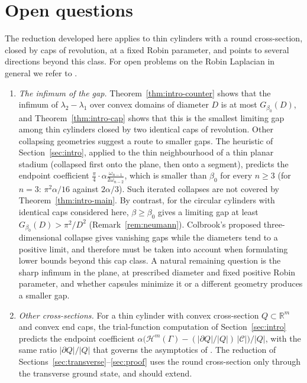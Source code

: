 \documentclass[11pt,a4paper]{article}
\numberwithin{equation}{section}
\theoremstyle{paperplain}
\theoremstyle{remark}
\newcommand{\R}{\mathbb{R}}
\newcommand{\C}{\mathcal{C}}
\newcommand{\HH}{\mathcal{H}}
\begin{document}
\FloatBarrier
\section{Open questions}\label{sec:open}
The reduction developed here applies to thin cylinders with a round
cross-section, closed by caps of revolution, at a fixed Robin parameter, and
points to several directions beyond this class. For open problems on the
Robin Laplacian in general we refer to \cite{BFK}.

\begin{enumerate}[label=(\arabic*)]
\item \emph{The infimum of the gap.} Theorem~\ref{thm:intro-counter} shows
that the infimum of $\lambda_2-\lambda_1$ over convex domains of diameter
$D$ is at most $G_{\beta_0}(D)$, and Theorem~\ref{thm:intro-cap} shows that
this is the smallest limiting gap among thin cylinders closed by two
identical caps of revolution. Other collapsing geometries suggest a route
to smaller gaps. The heuristic of
Section~\ref{sec:intro}, applied to the thin neighbourhood of a thin planar
stadium (collapsed first onto the plane, then onto a segment), predicts the
endpoint coefficient $\frac{\pi}{4}\cdot\alpha\frac{\omega_{n-1}}{2\omega_{n-2}}$,
which is smaller than $\beta_0$ for every $n\ge3$ (for $n=3$: $\pi^2\alpha/16$
against $2\alpha/3$). Such iterated collapses are not covered by
Theorem~\ref{thm:intro-main}. By contrast, for the circular cylinders with
identical caps considered here, $\beta\ge\beta_0$ gives a limiting gap at
least $G_{\beta_0}(D)>\pi^2/D^2$ (Remark~\ref{rem:neumann}). Colbrook's proposed three-dimensional collapse \cite{Colbrook} gives
vanishing gaps while the diameters tend to a positive limit, and therefore
must be taken into account when formulating lower bounds beyond this cap
class. A natural remaining question is the sharp infimum in the plane,
at prescribed diameter and fixed positive Robin parameter, and whether
capsules minimize it or a different geometry produces a smaller gap.
\item \emph{Other cross-sections.} For a thin cylinder with convex
cross-section $Q\subset\R^m$ and convex end caps, the trial-function
computation of Section~\ref{sec:intro} predicts the endpoint coefficient
$\alpha\bigl(\HH^m(\Gamma)-(|\partial Q|/|Q|)\,|\C|\bigr)/|Q|$, with the same
ratio $|\partial Q|/|Q|$ that governs the asymptotics of
\cite{PankrashkinVogel}. The reduction of
Sections~\ref{sec:transverse}--\ref{sec:proof} uses the round
cross-section only through the transverse ground state, and should extend.

\end{enumerate}
\end{document}
